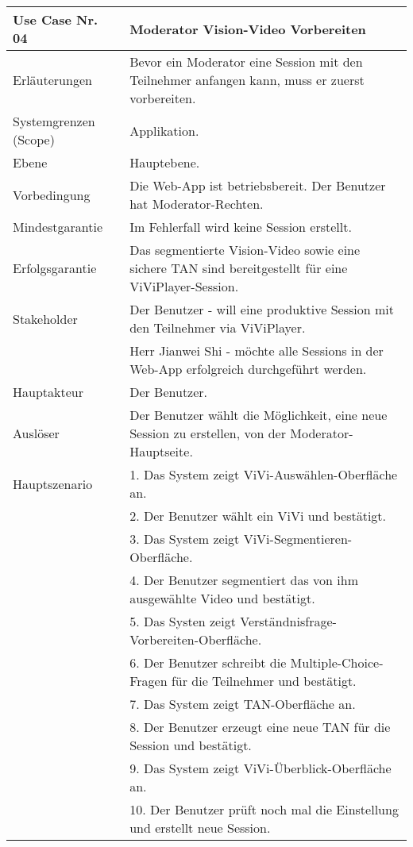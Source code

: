 \begin{tabularx}{\linewidth}{|l|X|}
	\hline
	Use Case Nr. 04			& \textbf{Moderator Vision-Video Vorbereiten} \\ \hline
	Erläuterungen			& Bevor ein Moderator eine Session mit den Teilnehmer anfangen kann,
							  muss er zuerst vorbereiten. \\ \hline
	Systemgrenzen (Scope)	& Applikation. \\ \hline
	Ebene					& Hauptebene. \\ \hline
	Vorbedingung			& Die Web-App ist betriebsbereit. Der Benutzer hat Moderator-Rechten. \\ \hline
	Mindestgarantie			& Im Fehlerfall wird keine Session erstellt.\\ \hline
	Erfolgsgarantie			& Das segmentierte Vision-Video sowie eine sichere TAN sind bereitgestellt für
							  eine ViViPlayer-Session. \\ \hline
	Stakeholder				& Der Benutzer - will eine produktive Session mit den Teilnehmer via
							  ViViPlayer. \\
							& Herr Jianwei Shi - möchte alle Sessions in der Web-App erfolgreich durchgeführt
							  werden. \\ \hline
	Hauptakteur				& Der Benutzer. \\ \hline
	Auslöser				& Der Benutzer wählt die Möglichkeit, eine neue Session zu erstellen, von der
							  Moderator-Hauptseite. \\ \hline	
	Hauptszenario			& 1. Das System zeigt ViVi-Auswählen-Oberfläche an. \\
							& 2. Der Benutzer wählt ein ViVi und bestätigt. \\ 
							& 3. Das System zeigt ViVi-Segmentieren-Oberfläche. \\ 
							& 4. Der Benutzer segmentiert das von ihm ausgewählte Video und bestätigt. \\
							& 5. Das Systen zeigt Verständnisfrage-Vorbereiten-Oberfläche. \\
							& 6. Der Benutzer schreibt die Multiple-Choice-Fragen für die Teilnehmer und 
							  bestätigt. \\
							& 7. Das System zeigt TAN-Oberfläche an. \\
							& 8. Der Benutzer erzeugt eine neue TAN für die Session und bestätigt. \\ 
							& 9. Das System zeigt ViVi-Überblick-Oberfläche an. \\ 
							& 10. Der Benutzer prüft noch mal die Einstellung und erstellt neue Session. \\

\end{tabularx}
